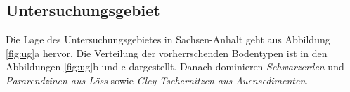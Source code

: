 \subsection{Untersuchungsgebiet}\label{sec:ug}
Die Lage des Untersuchungsgebietes in Sachsen-Anhalt geht aus Abbildung \ref{fig:ug}a hervor. Die Verteilung der vorherrschenden Bodentypen ist in den Abbildungen \ref{fig:ug}b und c dargestellt. Danach dominieren \textit{Schwarzerden} und \textit{Pararendzinen aus Löss} sowie \textit{Gley-Tschernitzen aus Auensedimenten}. 


\begin{figure}[p]
\centering{}

\end{figure}
